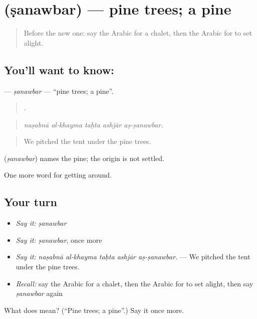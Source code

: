 \section[\texorpdfstring{\ar{صنوبر} (ṣanawbar)}{صنوبر (ṣanawbar)}]{ (ṣanawbar) — pine trees; a pine}

\label{lesson:AR-C442-sanawbar}



\begin{quote}
Before the new one: say the Arabic for a chalet, then the Arabic for to set alight.
\end{quote}

\subsection*{You'll want to know: }
\textbf{} — \emph{ṣanawbar} — \textquotedblleft{}pine trees; a pine\textquotedblright{}.

\begin{quote}
    .
\end{quote}

\begin{quote}
\emph{naṣabnā al-khayma taḥta ashjār aṣ-ṣanawbar.}
\end{quote}

\begin{quote}
We pitched the tent under the pine trees.
\end{quote}

\begin{cousinweb}
\textbf{} (\emph{ṣanawbar}) names the pine; the origin is not settled.
\end{cousinweb}

\begin{grammarlens}[title={What you've built}]
One more word for getting around.
\end{grammarlens}

\subsection*{Your turn}
\begin{itemize}
\raggedright
  \item \emph{Say it:} \emph{ṣanawbar}
  \item \emph{Say it:} \emph{ṣanawbar}, once more
  \item \emph{Say it:} \emph{naṣabnā al-khayma taḥta ashjār aṣ-ṣanawbar.} — We pitched the tent under the pine trees.
  \item \emph{Recall:} say the Arabic for a chalet, then the Arabic for to set alight, then say \emph{ṣanawbar} again
\end{itemize}

\begin{tcolorbox}[breakable,colback=teal!4,colframe=teal!35!black,title={Before you move on}]
What does  mean? (\textquotedblleft{}Pine trees; a pine\textquotedblright{}.) Say it once more.
\end{tcolorbox}
